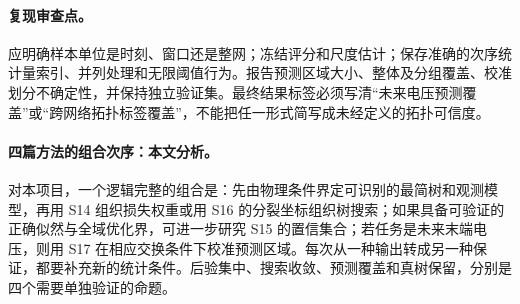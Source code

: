\paragraph{复现审查点。}
应明确样本单位是时刻、窗口还是整网；冻结评分和尺度估计；保存准确的次序统计量索引、并列处理和无限阈值行为。报告预测区域大小、整体及分组覆盖、校准划分不确定性，并保持独立验证集。最终结果标签必须写清“未来电压预测覆盖”或“跨网络拓扑标签覆盖”，不能把任一形式简写成未经定义的拓扑可信度。

\paragraph{四篇方法的组合次序：本文分析。}
对本项目，一个逻辑完整的组合是：先由物理条件界定可识别的最简树和观测模型，再用 S14 组织损失权重或用 S16 的分裂坐标组织树搜索；如果具备可验证的正确似然与全域优化界，可进一步研究 S15 的置信集合；若任务是未来末端电压，则用 S17 在相应交换条件下校准预测区域。每次从一种输出转成另一种保证，都要补充新的统计条件。后验集中、搜索收敛、预测覆盖和真树保留，分别是四个需要单独验证的命题。
